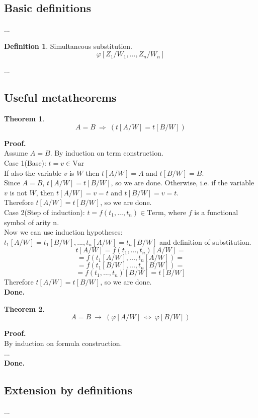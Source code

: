 \documentclass[10pt,a4paper]{article}
\theoremstyle{definition}
\newtheorem{definition}{Definition}[section]
\newtheorem{theorem}{Theorem}[section]
\newcommand{\Done}{\noindent \textbf{Done.}\\}
\renewcommand{\implies}{\ \longrightarrow\ }
\newcommand{\Proof}{\noindent \textbf{Proof.}\\}
\newcommand{\Term}{\mathrm{Term}}
\newcommand{\Var}{\mathrm{Var}}
\begin{document}
\subsection{Basic definitions}
...
\begin{definition} Simultaneous substitution.
\[
\varphi[Z_1/W_1,...,Z_n/W_n]
\]
\end{definition}
\noindent
...
\subsection{Useful metatheorems}
\begin{theorem}
\[
A=B\ \Longrightarrow\ (t[A/W]=t[B/W])
\]
\end{theorem}
\Proof
Assume $A=B$.
By induction on term construction.\\
Case 1(Base): $t=v\in \Var$\\
If also the variable $v$ is $W$ then $t[A/W]=A$ and $t[B/W]=B$.\\
Since $A=B$, $t[A/W]=t[B/W]$, so we are done.
Otherwise, i.e. if the variable $v$ is not $W$, then $t[A/W]=v=t$ and $t[B/W]=v=t$.\\
Therefore $t[A/W]=t[B/W]$, so we are done.\\
Case 2(Step of induction): $t=f(t_1,...,t_n)\in\Term$, where $f$ is a functional symbol of arity n.\\
Now we can use induction hypotheses: $t_1[A/W]=t_1[B/W],...,t_n[A/W]=t_n[B/W]$ and definition  of substitution.
\[
t[A/W]=f(t_1,...,t_n)[A/W]=
\]
\[
=f(t_1[A/W],...,t_n[A/W])=
\]
\[
=f(t_1[B/W],...,t_n[B/W])=
\]
\[
=f(t_1,...,t_n)[B/W]=t[B/W]
\]
Therefore $t[A/W]=t[B/W]$, so we are done.\\
\Done

\begin{theorem}
\[
A=B
\implies
(\varphi[A/W]\ \Longleftrightarrow\ \varphi[B/W])
\]
\end{theorem}
\Proof
By induction on formula construction.\\
...\\
\Done

\subsection{Extension by definitions}
...
\pagebreak
\end{document}
